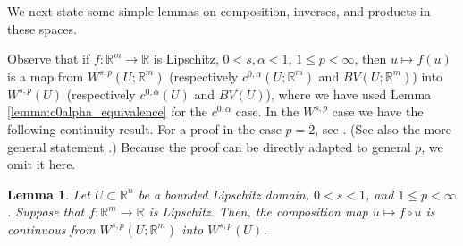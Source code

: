 \documentclass[12pt]{article}
\newcommand{\R}{\mathbb{R}}
\theoremstyle{plain}
\newtheorem{lemma}[theorem]{Lemma}
\numberwithin{equation}{section}
\begin{document}
    We next state some simple lemmas on composition, inverses, and products in these spaces.

    Observe that if $f : \R^m \to \R$ is Lipschitz, $0 < s,\alpha < 1$, $1 \le p < \infty$, then $u \mapsto f(u)$ is a map from $W^{s,p}(U;\R^m)$ (respectively $c^{0,\alpha}(U;\R^m)$ and $BV(U;\R^m)$) into $W^{s,p}(U)$ (respectively $c^{0,\alpha}(U)$ and $BV(U)$), where we have used Lemma \ref{lemma:c0alpha_equivalence} for the $c^{0,\alpha}$ case. In the $W^{s,p}$ case we have the following continuity result. For a proof in the case $p=2$, see \cite[Proof of (5.43)]{bbm_04}. (See also the more general statement \cite[Theorem 15.6]{brezis_mironescu_21}.) Because the proof can be directly adapted to general $p$, we omit it here.
    
    \begin{lemma} \label{lemma:composition_continuity}
        Let $U \subset \R^n$ be a bounded Lipschitz domain, $0<s<1$, and $1\leq p<\infty$. Suppose that $f : \R^m \to \R$ is Lipschitz. Then, the composition map $u \mapsto f\circ u$ is continuous from $W^{s,p}(U;\R^m)$ into $W^{s,p}(U)$.
    \end{lemma}
\end{document}
